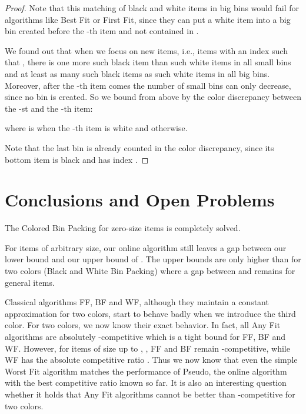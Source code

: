 \documentclass[11pt,a4paper]{article}
\begin{document}
\begin{proof}
Note that this matching of black and white items in big bins would fail
for algorithms like Best Fit or First Fit, since they can put
a white item into a big bin created before the -th item and not contained in .

We found out that when we focus on new items, i.e., items with an index  such that ,
there is one more such black item than such white items in all small bins
and at least as many such black items as such white items in all big bins.
Moreover, after the -th item comes the number of small bins  can only decrease,
since no bin is created.
So we bound  from above by the color discrepancy
between the -st and the -th item:

where  is  when the -th item is white and  otherwise.

Note that the last bin is already counted in the color discrepancy,
since its bottom item is black and has index .
\end{proof}

\section*{Conclusions and Open Problems}

The Colored Bin Packing for zero-size items is completely solved.

For items of arbitrary size, our online algorithm still leaves
a gap between our lower bound  and our upper bound of .
The upper bounds are only
 higher than for two colors (Black and White Bin Packing) where a
gap between  and  remains for general items.

Classical algorithms FF, BF and WF, although they maintain a constant
approximation for two colors, start to behave badly when we introduce
the third color.  For two colors, we now know their exact behavior.
In fact, all Any Fit algorithms are absolutely
-competitive which is a tight bound for FF, BF and WF. However, for
items of size up to , , FF and BF remain
-competitive, while WF has the absolute competitive ratio .
Thus we now know that
even the simple Worst Fit algorithm matches the
performance of Pseudo, the online algorithm with the best competitive
ratio known so far.
It is also an interesting question whether it
holds that Any Fit algorithms cannot be better than -competitive
for two colors.
\end{document}
